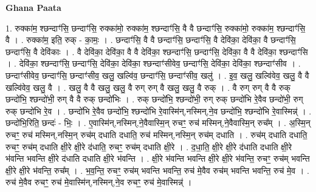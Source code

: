 \documentclass[17pt]{extarticle}
\begin{document}
\textbf{Ghana Paata } \newline

1. रुक्का॑म॒ श्छन्दाꣳ॑सि॒ छन्दाꣳ॑सि॒ रुक्का॑मो॒ रुक्का॑म॒ श्छन्दाꣳ॑सि॒ वै वै छन्दाꣳ॑सि॒ रुक्का॑मो॒ रुक्का॑म॒ श्छन्दाꣳ॑सि॒ वै । . रुक्का॑म॒ इति॒ रुक् - का॒मः॒ । . छन्दाꣳ॑सि॒ वै वै छन्दाꣳ॑सि॒ छन्दाꣳ॑सि॒ वै देवि॑का॒ देवि॑का॒ वै छन्दाꣳ॑सि॒ छन्दाꣳ॑सि॒ वै देवि॑काः । . वै देवि॑का॒ देवि॑का॒ वै वै देवि॑का॒ श्छन्दाꣳ॑सि॒ छन्दाꣳ॑सि॒ देवि॑का॒ वै वै देवि॑का॒ श्छन्दाꣳ॑सि । . देवि॑का॒ श्छन्दाꣳ॑सि॒ छन्दाꣳ॑सि॒ देवि॑का॒ देवि॑का॒ श्छन्दाꣳ॑सीवेव॒ छन्दाꣳ॑सि॒ देवि॑का॒ देवि॑का॒ श्छन्दाꣳ॑सीव । . छन्दाꣳ॑सीवेव॒ छन्दाꣳ॑सि॒ छन्दाꣳ॑सीव॒ खलु॒ खल्वि॑व॒ छन्दाꣳ॑सि॒ छन्दाꣳ॑सीव॒ खलु॑ । . इ॒व॒ खलु॒ खल्वि॑वेव॒ खलु॒ वै वै खल्वि॑वेव॒ खलु॒ वै । . खलु॒ वै वै खलु॒ खलु॒ वै रुग् रुग् वै खलु॒ खलु॒ वै रुक् । . वै रुग् रुग् वै वै रुक् छन्दो॑भि॒ श्छन्दो॑भी॒ रुग् वै वै रुक् छन्दो॑भिः । . रुक् छन्दो॑भि॒ श्छन्दो॑भी॒ रुग् रुक् छन्दो॑भि रे॒वैव छन्दो॑भी॒ रुग् रुक् छन्दो॑भि रे॒व । . छन्दो॑भि रे॒वैव छन्दो॑भि॒ श्छन्दो॑भि रे॒वास्मि॑न्,नस्मिन्,ने॒व छन्दो॑भि॒ श्छन्दो॑भि रे॒वास्मिन्न्॑ । . छन्दो॑भि॒रिति॒ छन्दः॑ - भिः॒ । . ए॒वास्मि॑न्,नस्मिन्,ने॒वैवास्मि॒न् रुचꣳ॒॒ रुच॑ मस्मिन्,ने॒वैवास्मि॒न् रुच᳚म् । . अ॒स्मि॒न् रुचꣳ॒॒ रुच॑ मस्मिन्,नस्मि॒न् रुच॑म् दधाति दधाति॒ रुच॑ मस्मिन्,नस्मि॒न् रुच॑म् दधाति । . रुच॑म् दधाति दधाति॒ रुचꣳ॒॒ रुच॑म् दधाति क्षी॒रे क्षी॒रे द॑धाति॒ रुचꣳ॒॒ रुच॑म् दधाति क्षी॒रे । . द॒धा॒ति॒ क्षी॒रे क्षी॒रे द॑धाति दधाति क्षी॒रे भ॑वन्ति भवन्ति क्षी॒रे द॑धाति दधाति क्षी॒रे भ॑वन्ति । . क्षी॒रे भ॑वन्ति भवन्ति क्षी॒रे क्षी॒रे भ॑वन्ति॒ रुचꣳ॒॒ रुच॑म् भवन्ति क्षी॒रे क्षी॒रे भ॑वन्ति॒ रुच᳚म् । . भ॒व॒न्ति॒ रुचꣳ॒॒ रुच॑म् भवन्ति भवन्ति॒ रुच॑ मे॒वैव रुच॑म् भवन्ति भवन्ति॒ रुच॑ मे॒व । . रुच॑ मे॒वैव रुचꣳ॒॒ रुच॑ मे॒वास्मि॑न्,नस्मिन्,ने॒व रुचꣳ॒॒ रुच॑ मे॒वास्मिन्न्॑ । \newline
\end{document}
